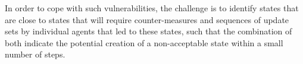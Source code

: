 \documentclass[a4paper,11pt]{article}
\newcommand{\project}[1]{\textbf{#1}\xspace}
\newcommand{\SECURITY}{\project{Elysian}}
\newcommand{\TheProject}{\SECURITY}
\begin{document}
In order to cope with such vulnerabilities, the challenge is to identify  states that are close to states that will require counter-measures and sequences of update sets by individual agents that led to these states, such that the combination of both indicate the potential creation of a non-acceptable state within a small number of steps. 

\end{document}
